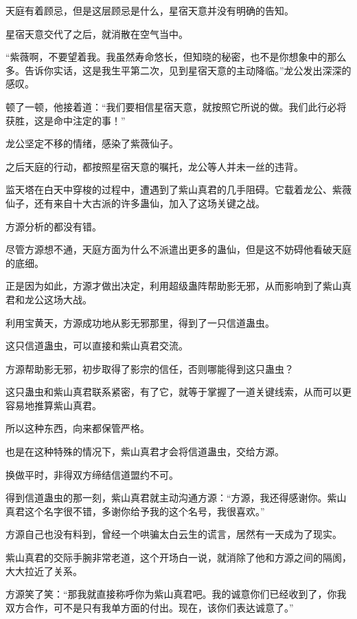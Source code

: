 
\begin{this_body}

天庭有着顾忌，但是这层顾忌是什么，星宿天意并没有明确的告知。

星宿天意交代了之后，就消散在空气当中。

“紫薇啊，不要望着我。我虽然寿命悠长，但知晓的秘密，也不是你想象中的那么多。告诉你实话，这是我生平第二次，见到星宿天意的主动降临。”龙公发出深深的感叹。

顿了一顿，他接着道：“我们要相信星宿天意，就按照它所说的做。我们此行必将获胜，这是命中注定的事！”

龙公坚定不移的情绪，感染了紫薇仙子。

之后天庭的行动，都按照星宿天意的嘱托，龙公等人并未一丝的违背。

监天塔在白天中穿梭的过程中，遭遇到了紫山真君的几手阻碍。它载着龙公、紫薇仙子，还有来自十大古派的许多蛊仙，加入了这场关键之战。

方源分析的都没有错。

尽管方源想不通，天庭方面为什么不派遣出更多的蛊仙，但是这不妨碍他看破天庭的底细。

正是因为如此，方源才做出决定，利用超级蛊阵帮助影无邪，从而影响到了紫山真君和龙公这场大战。

利用宝黄天，方源成功地从影无邪那里，得到了一只信道蛊虫。

这只信道蛊虫，可以直接和紫山真君交流。

方源帮助影无邪，初步取得了影宗的信任，否则哪能得到这只蛊虫？

这只蛊虫和紫山真君联系紧密，有了它，就等于掌握了一道关键线索，从而可以更容易地推算紫山真君。

所以这种东西，向来都保管严格。

也是在这种特殊的情况下，紫山真君才会将信道蛊虫，交给方源。

换做平时，非得双方缔结信道盟约不可。

得到信道蛊虫的那一刻，紫山真君就主动沟通方源：“方源，我还得感谢你。紫山真君这个名字很不错，多谢你给予我的这个名号，我很喜欢。”

方源自己也没有料到，曾经一个哄骗太白云生的谎言，居然有一天成为了现实。

紫山真君的交际手腕非常老道，这个开场白一说，就消除了他和方源之间的隔阂，大大拉近了关系。

方源笑了笑：“那我就直接称呼你为紫山真君吧。我的诚意你们已经收到了，你我双方合作，可不是只有我单方面的付出。现在，该你们表达诚意了。”


\end{this_body}
